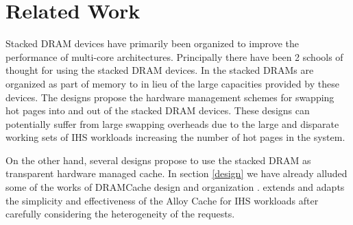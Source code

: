\section{Related Work} \label{related-work}
Stacked DRAM devices have primarily been organized to improve the performance of multi-core architectures. Principally there have been 2 schools of thought for using the stacked DRAM devices. In \cite{pom,cameo} the stacked DRAMs are organized as part of memory to in lieu of the large capacities provided by these devices. The designs propose the hardware management schemes for swapping hot pages into and out of the stacked DRAM devices. These designs can potentially suffer from large swapping overheads due to the large and disparate working sets of IHS workloads increasing the number of hot pages in the system.
\par On the other hand, several designs propose to use the stacked DRAM as transparent hardware managed cache. In section \ref{design} we have already alluded some of the works of DRAMCache design and organization \cite{alloy,atcache.bimodal.loh-hill}. \cachename extends and adapts the simplicity and effectiveness of the Alloy Cache for IHS workloads after carefully considering the heterogeneity of the requests. 